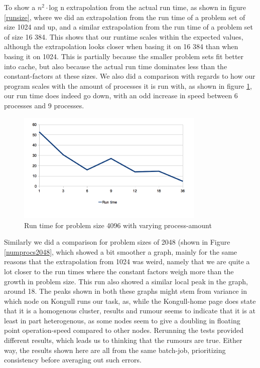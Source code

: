To show a $n^2\cdot$log n extrapolation from the actual run time, as shown in figure \ref{runsize}, where we did an extrapolation from the run time of a problem set of size 1024 and up, and a similar extrapolation from the run time of a problem set of size 16 384. This shows that our runtime scales within the expected values, although the extrapolation looks closer when basing it on 16 384 than when basing it on 1024. This is partially because the smaller problem sets fit better into cache, but also because the actual run time dominates less than the constant-factors at these sizes.
\FloatBarrier
We also did a comparison with regards to how our program scales with the amount of processes it is run with,
as shown in figure \ref{numprocs4096}, our run time does indeed go down, with an odd increase in speed between 6 processes and 9 processes.
\begin{figure}[t]
  \centering
    \includegraphics[width=0.8\textwidth]{RunTimePerProcess4096.png}
    \caption{Run time for problem size 4096 with varying process-amount}
    \label{numprocs4096}
\end{figure}

Similarly we did a comparison for problem sizes of 2048 (shown in Figure \ref{numprocs2048}, which showed a bit smoother a graph, mainly for the same reasons that the extrapolation from 1024 was weird, namely that we are quite a lot closer to the run times where the constant factors weigh more than the growth in problem size. This run also showed a similar local peak in the graph, around 18. The peaks shown in both these graphs might stem from variance in which node on Kongull runs our task, as, while
the Kongull-home page does state that it is a homogenous cluster, results and rumour seems to indicate that it is at least in part heterogenous, as some nodes seem to give a doubling in floating point operation-speed compared to other nodes. Rerunning the tests provided different results, which leads us to thinking that the rumours are true. Either way, the results shown here are all from the same batch-job, prioritizing consistency before averaging out such errors.

